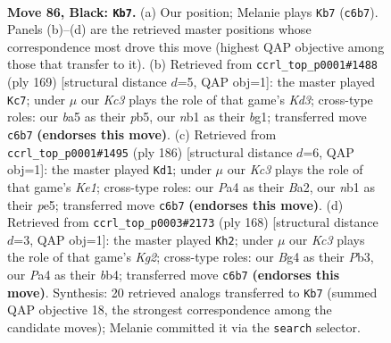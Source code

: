 \documentclass[11pt]{article}
\begin{document}
\clearpage

\begin{figure}[p]\centering
\begin{subfigure}{0.46\textwidth}\centering
\resizebox{\linewidth}{!}{%
\newchessgame
\chessboard[
  setfen={8/8/2k5/B7/p1p3b1/8/5K2/1N6 b - - 27 86},
  showmover=false,
  pgfstyle=straightmove, color=movearrow, markmove={c6-b7}
]}
\caption{}
\end{subfigure}\hfill
\begin{subfigure}{0.46\textwidth}\centering
\resizebox{\linewidth}{!}{%
\newchessgame
\chessboard[
  setfen={8/8/3k4/1P5b/5p2/8/3K4/6B1 b - - 9 85},
  showmover=false,
  pgfstyle=straightmove, color=movearrow, markmove={d6-c7}
]}
\caption{}
\end{subfigure}
\\[4pt]
\begin{subfigure}{0.46\textwidth}\centering
\resizebox{\linewidth}{!}{%
\newchessgame
\chessboard[
  setfen={3k4/8/8/4p3/8/4bP2/B7/4K3 w - - 9 94},
  showmover=false,
  pgfstyle=straightmove, color=movearrow, markmove={e1-d1}
]}
\caption{}
\end{subfigure}\hfill
\begin{subfigure}{0.46\textwidth}\centering
\resizebox{\linewidth}{!}{%
\newchessgame
\chessboard[
  setfen={4B3/8/8/6n1/1b1k4/1P6/6K1/8 w - - 14 85},
  showmover=false,
  pgfstyle=straightmove, color=movearrow, markmove={g2-h2}
]}
\caption{}
\end{subfigure}
\caption{\textbf{Move 86, Black: \texttt{Kb7}.} (a) Our position; Melanie plays \texttt{Kb7} (\texttt{c6b7}). Panels (b)--(d) are the retrieved master positions whose correspondence most drove this move (highest QAP objective among those that transfer to it). (b) Retrieved from \texttt{ccrl\_top\_p0001\#1488} (ply 169) [structural distance $d$=5, QAP obj=1]: the master played \texttt{Kc7}; under $\mu$ our \emph{Kc3} plays the role of that game's \emph{Kd3}; cross-type roles: our \emph{b}a5 as their \emph{p}b5, our \emph{n}b1 as their \emph{b}g1; transferred move \texttt{c6b7} \textbf{(endorses this move)}. (c) Retrieved from \texttt{ccrl\_top\_p0001\#1495} (ply 186) [structural distance $d$=6, QAP obj=1]: the master played \texttt{Kd1}; under $\mu$ our \emph{Kc3} plays the role of that game's \emph{Ke1}; cross-type roles: our \emph{P}a4 as their \emph{B}a2, our \emph{n}b1 as their \emph{p}e5; transferred move \texttt{c6b7} \textbf{(endorses this move)}. (d) Retrieved from \texttt{ccrl\_top\_p0003\#2173} (ply 168) [structural distance $d$=3, QAP obj=1]: the master played \texttt{Kh2}; under $\mu$ our \emph{Kc3} plays the role of that game's \emph{Kg2}; cross-type roles: our \emph{B}g4 as their \emph{P}b3, our \emph{P}a4 as their \emph{b}b4; transferred move \texttt{c6b7} \textbf{(endorses this move)}. Synthesis: 20 retrieved analogs transferred to \texttt{Kb7} (summed QAP objective 18, the strongest correspondence among the candidate moves); Melanie committed it via the \texttt{search} selector.}
\label{fig:thought-m171}
\end{figure}
\end{document}
